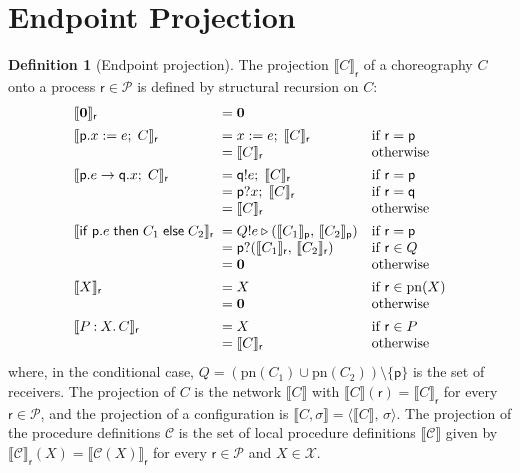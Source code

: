 \documentclass[11pt]{article}
\theoremstyle{plain}
\theoremstyle{definition}
\newtheorem{definition}[theorem]{Definition}
\theoremstyle{remark}
\newcommand{\kw}[1]{\mathsf{#1}}
\newcommand{\kif}{\kw{if}\;}
\newcommand{\kthen}{\;\kw{then}\;}
\newcommand{\kelse}{\;\kw{else}\;}
\newcommand{\nil}{\mathbf{0}}
\newcommand{\seq}{;\;}
\newcommand{\pp}{\mathsf{p}}
\newcommand{\qq}{\mathsf{q}}
\newcommand{\rr}{\mathsf{r}}
\newcommand{\Procs}{\mathcal{P}}
\newcommand{\pn}{\mathrm{pn}}
\newcommand{\conf}[2]{\langle #1,\, #2\rangle}
\newcommand{\proj}[2]{\llbracket #1 \rrbracket_{#2}}
\newcommand{\projn}[1]{\llbracket #1 \rrbracket}
\newcommand{\ifcond}[3]{\kif #1 \kthen #2 \kelse #3}
\newcommand{\sendbr}[4]{#1!#2 \mathbin{\triangleright} (#3,\, #4)}
\newcommand{\recvbr}[3]{#1?(#2,\, #3)}
\newcommand{\Pnames}{\mathcal{X}}
\newcommand{\Defs}{\mathcal{C}}
\newcommand{\body}[1]{\Defs(#1)}
\newcommand{\rt}[3]{#1\mathbin{:}#2.\,#3}
\begin{document}
\section{Endpoint Projection}
\label{sec:epp}

\begin{definition}[Endpoint projection]\label{def:epp}
  The projection $\proj{C}{\rr}$ of a choreography $C$ onto a process
  $\rr\in\Procs$ is defined by structural recursion on $C$:
  \[
  \begin{array}{l@{\;\;}l@{\quad}l}
    \proj{\nil}{\rr} & = \nil \\[1ex]
    \proj{\pp.x := e \seq C}{\rr} & = x := e \seq \proj{C}{\rr} & \text{if } \rr = \pp\\
                                  & = \proj{C}{\rr} & \text{otherwise}\\[1ex]
    \proj{\pp.e \to \qq.x \seq C}{\rr} & = \qq!e \seq \proj{C}{\rr} & \text{if } \rr = \pp\\
                                       & = \pp?x \seq \proj{C}{\rr} & \text{if } \rr = \qq\\
                                       & = \proj{C}{\rr} & \text{otherwise}\\[1ex]
    \proj{\ifcond{\pp.e}{C_1}{C_2}}{\rr} & = \sendbr{Q}{e}{\proj{C_1}{\pp}}{\proj{C_2}{\pp}} & \text{if } \rr = \pp\\
                                         & = \recvbr{\pp}{\proj{C_1}{\rr}}{\proj{C_2}{\rr}} & \text{if } \rr \in Q\\
                                         & = \nil & \text{otherwise}\\[1ex]
    \proj{X}{\rr} & = X & \text{if } \rr \in \pn(X)\\
                  & = \nil & \text{otherwise}\\[1ex]
    \proj{\rt{P}{X}{C}}{\rr} & = X & \text{if } \rr \in P\\
                             & = \proj{C}{\rr} & \text{otherwise}
  \end{array}
  \]
  where, in the conditional case, $Q = (\pn(C_1)\cup\pn(C_2))\setminus\{\pp\}$
  is the set of receivers.  The projection of $C$ is the network
  $\projn{C}$ with $\projn{C}(\rr) = \proj{C}{\rr}$ for every $\rr\in\Procs$,
  and the projection of a configuration is
  $\projn{C,\sigma} = \conf{\projn{C}}{\sigma}$.  The projection of the
  procedure definitions $\Defs$ is the set of local procedure definitions
  $\projn{\Defs}$ given by $\projn{\Defs}_\rr(X) = \proj{\body{X}}{\rr}$ for
  every $\rr\in\Procs$ and $X\in\Pnames$.
\end{definition}
\end{document}
